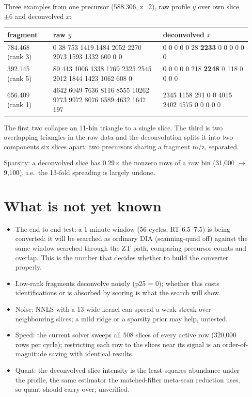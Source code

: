 \documentclass[11pt]{article}
\begin{document}
Three examples from one precursor (588.306, z=2), raw profile $y$ over own slice $\pm6$ and deconvolved $x$:
\begin{center}\small\begin{tabular}{lll}\toprule
fragment & raw $y$ & deconvolved $x$ \\ \midrule
784.468 (rank 3) & 0 38 753 1419 1484 2052 2270 2073 1593 1332 600 0 0 & 0 0 0 0 0 28 \textbf{2233} 0 0 0 0 0 0 \\
392.145 (rank 5) & 80 443 1006 1338 1769 2325 2545 2012 1844 1423 1062 608 0 & 0 0 0 0 0 218 \textbf{2248} 0 118 0 0 0 0 \\
656.409 (rank 1) & 4642 6049 7636 8116 8555 10262 9773 9972 8076 6589 4632 1647 197 & 2345 1158 291 0 0 4015 2402 4575 0 0 0 0 0 \\ \bottomrule
\end{tabular}\end{center}
The first two collapse an 11-bin triangle to a single slice. The third is two overlapping triangles in the raw data and the deconvolution splits it into two components six slices apart: two precursors sharing a fragment m/z, separated.

Sparsity: a deconvolved slice has 0.29$\times$ the nonzero rows of a raw bin (31,000 $\to$ 9,100), i.e.\ the 13-fold spreading is largely undone.

\section{What is not yet known}
\begin{itemize}
\item The end-to-end test: a 1-minute window (56 cycles, RT 6.5--7.5) is being converted; it will be searched as ordinary DIA (scanning-quad off) against the same window searched through the ZT path, comparing precursor counts and overlap. This is the number that decides whether to build the converter properly.
\item Low-rank fragments deconvolve noisily (p25 = 0); whether this costs identifications or is absorbed by scoring is what the search will show.
\item Noise: NNLS with a 13-wide kernel can spread a weak streak over neighbouring slices; a mild ridge or a sparsity prior may help, untested.
\item Speed: the current solver sweeps all 508 slices of every active row (320,000 rows per cycle); restricting each row to the slices near its signal is an order-of-magnitude saving with identical results.
\item Quant: the deconvolved slice intensity is the least-squares abundance under the profile, the same estimator the matched-filter meta-scan reduction uses, so quant should carry over; unverified.
\end{itemize}
\end{document}
